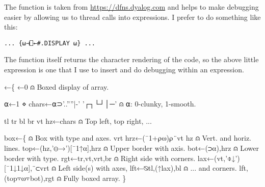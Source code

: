 \documentclass{article}%
\begin{document}
The {\Tt{}\nwendquote} function is taken from \url{https://dfns.dyalog.com}
and helps to make debugging easier by allowing us to thread
{\Tt{}\nwendquote} calls into expressions. I prefer to do something like
this:

\begin{verbatim}
... {⍵⊣⎕←#.DISPLAY ⍵} ...
\end{verbatim}

\noindent
The function itself returns the character rendering of the code,
so the above little expression is one that I use to insert and do
debugging within an expression.

\nwenddocs{}\endmoddef\nwstartdeflinemarkup\nwenddeflinemarkup
{}←\{ ←0                                                                                      ⍝ Boxed display of array.

        ⍺←1 ⋄ chars←⍺⊃'..''''|-' '┌┐└┘│─'                       ⍝ ⍺: 0-clunky, 1-smooth.

        tl tr bl br vt hz←chars                                                               ⍝ Top left, top right, ...

        box←\{                                                                                                                                 ⍝ Box with type and axes.
                vrt hrz←(¯1+⍴⍵)⍴¨vt hz                                                        ⍝ Vert. and horiz. lines.
                top←(hz,'⊖→')[¯1↑⍺],hrz                                                      ⍝ Upper border with axis.
                bot←(⊃⍺),hrz                                                                                              ⍝ Lower border with type.
                rgt←tr,vt,vrt,br                                                                              ⍝ Right side with corners.
                lax←(vt,'⌽↓')[¯1↓1↓⍺],¨⊂vrt                                     ⍝ Left side(s) with axes,
                lft←⍉tl,(↑lax),bl                                                                         ⍝ ... and corners.
                lft,(top⍪⍵⍪bot),rgt                                                                       ⍝ Fully boxed array.
        \}
\end{document}
